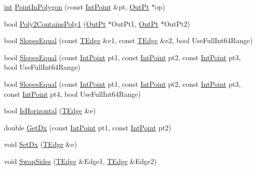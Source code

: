 \begin{DoxyCompactItemize}
\item 
\mbox{\hyperlink{draw_8hh_aa620a13339ac3a1177c86edc549fda9b}{int}} \mbox{\hyperlink{namespace_clipper_lib_a35576f17125b022fdc726cbc4cb1ea50}{Point\+In\+Polygon}} (const \mbox{\hyperlink{struct_clipper_lib_1_1_int_point}{Int\+Point}} \&pt, \mbox{\hyperlink{struct_clipper_lib_1_1_out_pt}{Out\+Pt}} $\ast$op)
\item 
bool \mbox{\hyperlink{namespace_clipper_lib_a9a24c8b4723d9c93c2d3eabb139c4366}{Poly2\+Contains\+Poly1}} (\mbox{\hyperlink{struct_clipper_lib_1_1_out_pt}{Out\+Pt}} $\ast$Out\+Pt1, \mbox{\hyperlink{struct_clipper_lib_1_1_out_pt}{Out\+Pt}} $\ast$Out\+Pt2)
\item 
bool \mbox{\hyperlink{namespace_clipper_lib_a052da0ab7e1690b61e36e007769df9f8}{Slopes\+Equal}} (const \mbox{\hyperlink{struct_clipper_lib_1_1_t_edge}{T\+Edge}} \&e1, const \mbox{\hyperlink{struct_clipper_lib_1_1_t_edge}{T\+Edge}} \&e2, bool Use\+Full\+Int64\+Range)
\item 
bool \mbox{\hyperlink{namespace_clipper_lib_a85fe5803e6f06dd9963cb4b222824ff3}{Slopes\+Equal}} (const \mbox{\hyperlink{struct_clipper_lib_1_1_int_point}{Int\+Point}} pt1, const \mbox{\hyperlink{struct_clipper_lib_1_1_int_point}{Int\+Point}} pt2, const \mbox{\hyperlink{struct_clipper_lib_1_1_int_point}{Int\+Point}} pt3, bool Use\+Full\+Int64\+Range)
\item 
bool \mbox{\hyperlink{namespace_clipper_lib_a5ce63c03021b0da24f00de41a2a72bcd}{Slopes\+Equal}} (const \mbox{\hyperlink{struct_clipper_lib_1_1_int_point}{Int\+Point}} pt1, const \mbox{\hyperlink{struct_clipper_lib_1_1_int_point}{Int\+Point}} pt2, const \mbox{\hyperlink{struct_clipper_lib_1_1_int_point}{Int\+Point}} pt3, const \mbox{\hyperlink{struct_clipper_lib_1_1_int_point}{Int\+Point}} pt4, bool Use\+Full\+Int64\+Range)
\item 
bool \mbox{\hyperlink{namespace_clipper_lib_af9afcf65d7038ec26bf32b7d0c312c37}{Is\+Horizontal}} (\mbox{\hyperlink{struct_clipper_lib_1_1_t_edge}{T\+Edge}} \&e)
\item 
double \mbox{\hyperlink{namespace_clipper_lib_adb890cca4fa2a71731b91968cf4ff49d}{Get\+Dx}} (const \mbox{\hyperlink{struct_clipper_lib_1_1_int_point}{Int\+Point}} pt1, const \mbox{\hyperlink{struct_clipper_lib_1_1_int_point}{Int\+Point}} pt2)
\item 
void \mbox{\hyperlink{namespace_clipper_lib_ae6087af5cfe151e4b98723135e3575f7}{Set\+Dx}} (\mbox{\hyperlink{struct_clipper_lib_1_1_t_edge}{T\+Edge}} \&e)
\item 
void \mbox{\hyperlink{namespace_clipper_lib_a63ceaffceda5d8e57ef98a0d7317b342}{Swap\+Sides}} (\mbox{\hyperlink{struct_clipper_lib_1_1_t_edge}{T\+Edge}} \&Edge1, \mbox{\hyperlink{struct_clipper_lib_1_1_t_edge}{T\+Edge}} \&Edge2)

\end{DoxyCompactItemize}
